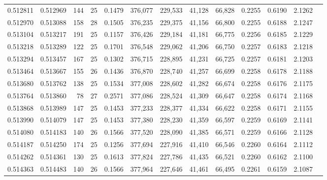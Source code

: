 \begin{tabular}{rrrrrrrrrrrrr}
0.512811 & 0.512969 &   144 &  25 &                                     0.1479 & 376,077 & 229,533 &  41,128 &  66,828 & 0.2255 & 0.6190 & 2.1262 \\
0.512970 & 0.513088 &   158 &  28 &                                     0.1505 & 376,235 & 229,375 &  41,156 &  66,800 & 0.2255 & 0.6188 & 2.1247 \\
0.513104 & 0.513217 &   191 &  25 &                                     0.1157 & 376,426 & 229,184 &  41,181 &  66,775 & 0.2256 & 0.6185 & 2.1229 \\
0.513218 & 0.513289 &   122 &  25 &                                     0.1701 & 376,548 & 229,062 &  41,206 &  66,750 & 0.2257 & 0.6183 & 2.1218 \\
0.513294 & 0.513457 &   167 &  25 &                                     0.1302 & 376,715 & 228,895 &  41,231 &  66,725 & 0.2257 & 0.6181 & 2.1203 \\
0.513464 & 0.513667 &   155 &  26 &                                     0.1436 & 376,870 & 228,740 &  41,257 &  66,699 & 0.2258 & 0.6178 & 2.1188 \\
0.513680 & 0.513762 &   138 &  25 &                                     0.1534 & 377,008 & 228,602 &  41,282 &  66,674 & 0.2258 & 0.6176 & 2.1175 \\
0.513764 & 0.513860 &    78 &  27 &                                     0.2571 & 377,086 & 228,524 &  41,309 &  66,647 & 0.2258 & 0.6174 & 2.1168 \\
0.513868 & 0.513989 &   147 &  25 &                                     0.1453 & 377,233 & 228,377 &  41,334 &  66,622 & 0.2258 & 0.6171 & 2.1155 \\
0.513990 & 0.514079 &   147 &  25 &                                     0.1453 & 377,380 & 228,230 &  41,359 &  66,597 & 0.2259 & 0.6169 & 2.1141 \\
0.514080 & 0.514183 &   140 &  26 &                                     0.1566 & 377,520 & 228,090 &  41,385 &  66,571 & 0.2259 & 0.6166 & 2.1128 \\
0.514187 & 0.514250 &   174 &  25 &                                     0.1256 & 377,694 & 227,916 &  41,410 &  66,546 & 0.2260 & 0.6164 & 2.1112 \\
0.514262 & 0.514361 &   130 &  25 &                                     0.1613 & 377,824 & 227,786 &  41,435 &  66,521 & 0.2260 & 0.6162 & 2.1100 \\
0.514363 & 0.514483 &   140 &  26 &                                     0.1566 & 377,964 & 227,646 &  41,461 &  66,495 & 0.2261 & 0.6159 & 2.1087 \\

\end{tabular}
